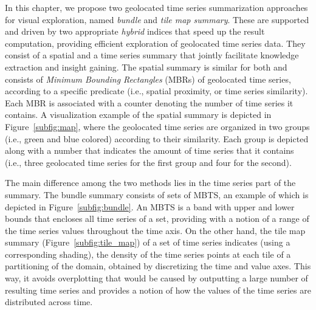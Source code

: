 In this chapter, we propose two geolocated time series summarization approaches for visual exploration, named {\em bundle} and {\em tile map summary}. These are supported and driven by two appropriate {\em hybrid} indices that speed up the result computation, providing efficient exploration of geolocated time series data. They consist of a spatial and a time series summary that jointly facilitate knowledge extraction and insight gaining. The spatial summary is similar for both and consists of {\em Minimum Bounding Rectangles} (MBRs) of geolocated time series, according to a specific predicate (i.e., spatial proximity, or time series similarity). Each MBR is associated with a counter denoting the number of time series it contains. A visualization example of the spatial summary is depicted in Figure~\ref{subfig:map}, where the geolocated time series are organized in two groups (i.e., green and blue colored) according to their similarity. Each group is depicted along with a number that indicates the amount of time series that it contains (i.e., three geolocated time series for the first group and four for the second).

The main difference among the two methods lies in the time series part of the summary. The bundle summary consists of sets of MBTS, an example of which is depicted in Figure~\ref{subfig:bundle}. An MBTS is a band with upper and lower bounds that encloses all time series of a set, providing with a notion of a range of the time series values throughout the time axis. On the other hand, the tile map summary (Figure~\ref{subfig:tile_map}) of a set of time series indicates (using a corresponding shading), the density of the time series points at each tile of a partitioning of the domain, obtained by discretizing the time and value axes. This way, it avoids overplotting that would be caused by outputting a large number of resulting time series and provides a notion of how the values of the time series are distributed across time.

